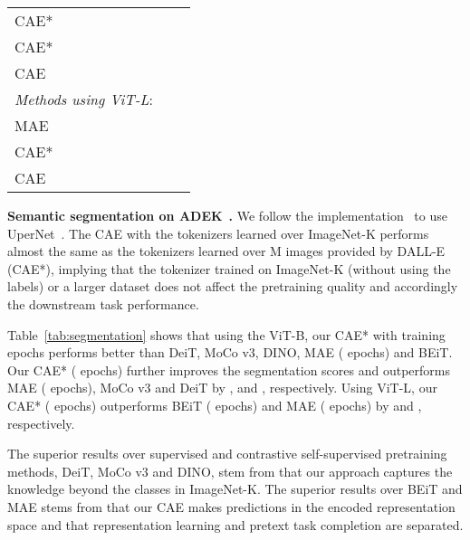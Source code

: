 \documentclass[twocolumn]{svjour3}          \smartqed  \usepackage{graphicx}
\newcommand{\cmark}{}
\newcommand{\xmarkg}{}
\def \ours {CAE*\xspace}
\def \oursdvae {CAE\xspace}
\begin{document}
\begin{table*}[t]
\begin{tabular}{l c c c  c c c   c  c c}
        \ours &   & \xmarkg & \cmark &   &  &  &  &  &  \\
        \ours &   & \xmarkg & \cmark &   &  &  &  &  &  \\
        \oursdvae &   & \xmarkg & \cmark &   &  &  &  &  &  \\
        \midrule
      \multicolumn{9}{l}{\emph{Methods using ViT-L}:}\\
        MAE &   & \xmarkg & \cmark &   &  &  &  &  &  \\
        \ours &   & \xmarkg & \cmark &   &  &  &  &  &  \\
        \oursdvae &   & \xmarkg & \cmark &   &  &  &  &  &  \\
        \bottomrule     
    \end{tabular} 
    \vspace{-0.2cm}
    \label{tab:cocodetection}
\end{table*}



 
\noindent\textbf{Semantic segmentation on ADEK}~\cite{zhou2017scene}\textbf{.}
We follow the implementation~\cite{bao2021beit}
to use UperNet~\cite{xiao2018unified}.
The CAE with the tokenizers learned over ImageNet-K
performs almost the same as the tokenizers learned over M images provided by DALL-E (CAE*),
implying that the tokenizer trained
on ImageNet-K (without using the labels) or a larger dataset
does not affect the pretraining quality and
accordingly the downstream task performance.

Table~\ref{tab:segmentation} shows that using the ViT-B, 
our CAE* with  training epochs
performs better
than DeiT,
MoCo v3, DINO,
MAE ( epochs)
and BEiT. 
Our CAE* ( epochs)
further improves the segmentation scores
and outperforms MAE ( epochs), MoCo v3 and
DeiT by ,  and , respectively. Using ViT-L, our CAE* ( epochs) outperforms BEiT ( epochs) and MAE ( epochs) by  and , respectively.

The superior results over supervised and contrastive self-supervised pretraining methods,
DeiT,
MoCo v3 and DINO,
stem from 
that our approach captures the knowledge beyond the  classes in ImageNet-K.
The superior results over BEiT
and MAE stems from that
our CAE makes predictions 
in the encoded representation space
and that representation learning
and pretext task completion
are separated. 
\end{document}
